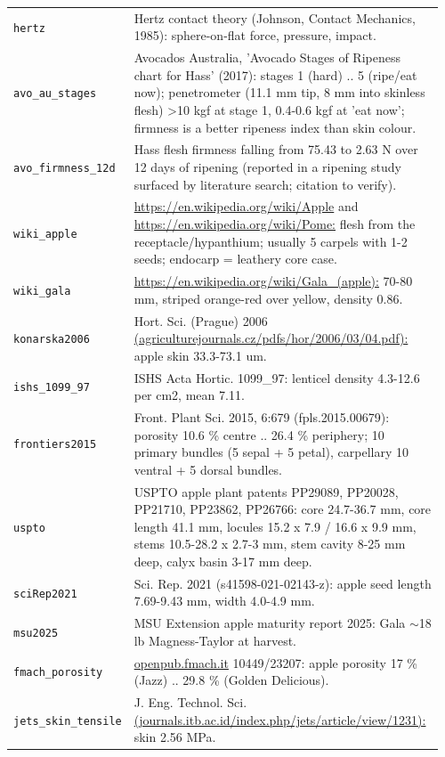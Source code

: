 \documentclass[10.5pt,a4paper]{article}
\begin{document}
{\begin{longtable}{@{}p{0.16\linewidth}p{0.8\linewidth}@{}}
\texttt{hertz} & Hertz contact theory (Johnson, Contact Mechanics, 1985): sphere-on-flat force, pressure, impact. \\
\texttt{avo\_\allowbreak{}au\_\allowbreak{}stages} & Avocados Australia, 'Avocado Stages of Ripeness chart for Hass' (2017): stages 1 (hard) .. 5 (ripe/eat now); penetrometer (11.1 mm tip, 8 mm into skinless flesh) >10 kgf at stage 1, 0.4-0.6 kgf at 'eat now'; firmness is a better ripeness index than skin colour. \\
\texttt{avo\_\allowbreak{}firmness\_\allowbreak{}12d} & Hass flesh firmness falling from 75.43 to 2.63 N over 12 days of ripening (reported in a ripening study surfaced by literature search; citation to verify). \\
\texttt{wiki\_\allowbreak{}apple} & \url{https://en.wikipedia.org/wiki/Apple} and \url{https://en.wikipedia.org/wiki/Pome:} flesh from the receptacle/hypanthium; usually 5 carpels with 1-2 seeds; endocarp = leathery core case. \\
\texttt{wiki\_\allowbreak{}gala} & \url{https://en.wikipedia.org/wiki/Gala_(apple):} 70-80 mm, striped orange-red over yellow, density 0.86. \\
\texttt{konarska2006} & Hort. Sci. (Prague) 2006 \url{(agriculturejournals.cz/pdfs/hor/2006/03/04.pdf):} apple skin 33.3-73.1 um. \\
\texttt{ishs\_\allowbreak{}1099\_\allowbreak{}97} & ISHS Acta Hortic. 1099\_97: lenticel density 4.3-12.6 per cm2, mean 7.11. \\
\texttt{frontiers2015} & Front. Plant Sci. 2015, 6:679 (fpls.2015.00679): porosity 10.6 \% centre .. 26.4 \% periphery; 10 primary bundles (5 sepal + 5 petal), carpellary 10 ventral + 5 dorsal bundles. \\
\texttt{uspto} & USPTO apple plant patents PP29089, PP20028, PP21710, PP23862, PP26766: core 24.7-36.7 mm, core length 41.1 mm, locules 15.2 x 7.9 / 16.6 x 9.9 mm, stems 10.5-28.2 x 2.7-3 mm, stem cavity 8-25 mm deep, calyx basin 3-17 mm deep. \\
\texttt{sciRep2021} & Sci. Rep. 2021 (s41598-021-02143-z): apple seed length 7.69-9.43 mm, width 4.0-4.9 mm. \\
\texttt{msu2025} & MSU Extension apple maturity report 2025: Gala $\sim$18 lb Magness-Taylor at harvest. \\
\texttt{fmach\_\allowbreak{}porosity} & \url{openpub.fmach.it} 10449/23207: apple porosity 17 \% (Jazz) .. 29.8 \% (Golden Delicious). \\
\texttt{jets\_\allowbreak{}skin\_\allowbreak{}tensile} & J. Eng. Technol. Sci. \url{(journals.itb.ac.id/index.php/jets/article/view/1231):} skin 2.56 MPa. \\

\end{longtable}}
\end{document}

